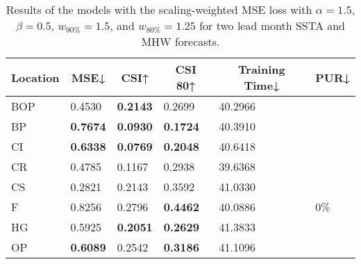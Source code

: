 \documentclass[11pt, a4paper]{article}
\begin{document}
\begin{table}[H]
\centering
\small
\caption{Results of the models with the scaling-weighted MSE loss with $\alpha=1.5$, $\beta=0.5$, $w_{90\%}=1.5$, and $w_{80\%}=1.25$ for two lead month SSTA and MHW forecasts.}
\begin{tabular}{llllll}
\multicolumn{1}{c}{\textbf{Location}} & \multicolumn{1}{c}{\textbf{MSE↓}} & \multicolumn{1}{c}{\textbf{CSI↑}} & \multicolumn{1}{c}{\textbf{CSI 80↑}} & \multicolumn{1}{c}{\textbf{Training Time↓}} & \multicolumn{1}{c}{\textbf{PUR↓}} \\ \hline
BOP                         & 0.4530                            & \textbf{0.2143}                   & 0.2699                               & 40.2966                                     &                                   \\
BP                        & \textbf{0.7674}                   & \textbf{0.0930}                   & \textbf{0.1724}                      & 40.3910                                     &                                   \\
CI                        & \textbf{0.6338}                   & \textbf{0.0769}                   & \textbf{0.2048}                      & 40.6418                                     &                                   \\
CR                           & 0.4785                            & 0.1167                            & 0.2938                               & 39.6368                                     &                                   \\
CS                           & 0.2821                            & 0.2143                            & 0.3592                               & 41.0330                                     &                                   \\
F                             & 0.8256                            & 0.2796                            & \textbf{0.4462}                      & 40.0886                                     & 0\%                               \\
HG                          & 0.5925                            & \textbf{0.2051}                   & \textbf{0.2629}                      & 41.3833                                     &                                   \\
OP                       & \textbf{0.6089}                   & 0.2542                            & \textbf{0.3186}                      & 41.1096                                     &                                   \\

\end{tabular}
\end{table}
\end{document}
